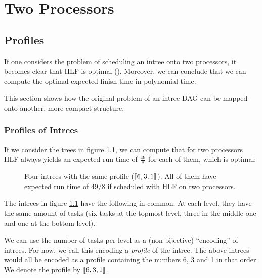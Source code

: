 \chapter{Two Processors}
\label{chap:p2}

\section{Profiles}
\label{sec:p2-profiles}


If one considers the problem of scheduling an intree onto two processors, it becomes clear that HLF is optimal ().  Moreover, we can conclude that we can compute the optimal expected finish time in polynomial time.

This section shows how the original problem of an intree DAG can be mapped onto another, more compact structure.

\subsection{Profiles of Intrees}
\label{sec:p2-simple-method-runtime-profiles-for-intrees}

If we consider the trees in figure \ref{fig:p2-four-intrees-with-same-profile-6-3-1}, we can compute that for two processors HLF always yields an expected run time of $\frac{49}{8}$ for each of them, which is optimal:

\begin{figure}[ht]
  \centering
  \hspace{0.5cm}
  \hspace{0.5cm}
  \hspace{0.5cm}
  
  \caption{Four intrees with the same profile ($\left\llbracket 6,3,1 \right\rrbracket$). All of them have expected run time of $49/8$ if scheduled with HLF on two processors.}
  \label{fig:p2-four-intrees-with-same-profile-6-3-1}
\end{figure}

The intrees in figure \ref{fig:p2-four-intrees-with-same-profile-6-3-1} have the following in common: At each level, they have the same amount of tasks (six tasks at the topmost level, three in the middle one and one at the bottom level).

We can use the number of tasks per level as a (non-bijective) ``encoding'' of intrees. For now, we call this encoding a \emph{profile} of the intree. The above intrees would all be encoded as a profile containing the numbers 6, 3 and 1 in that order. We denote the profile by $\left\llbracket 6, 3, 1 \right\rrbracket$.

